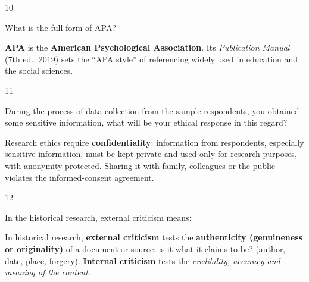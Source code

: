 \begin{question}{10}
{What is the full form of APA?\par}
\begin{explain}
\textbf{APA} is the \textbf{American Psychological Association}. Its \emph{Publication Manual} (7th ed., 2019) sets the ``APA style'' of referencing widely used in education and the social sciences.
\end{explain}
\end{question}

\begin{question}{11}
{During the process of data collection from the sample respondents, you obtained some sensitive information, what will be your ethical response in this regard?\par}
\begin{explain}
Research ethics require \textbf{confidentiality}: information from respondents, especially sensitive information, must be kept private and used only for research purposes, with anonymity protected. Sharing it with family, colleagues or the public violates the informed-consent agreement.
\end{explain}
\end{question}

\begin{question}{12}
{In the historical research, external criticism means:\par}
\begin{explain}
In historical research, \textbf{external criticism} tests the \textbf{authenticity (genuineness or originality)} of a document or source: is it what it claims to be? (author, date, place, forgery). \textbf{Internal criticism} tests the \emph{credibility, accuracy and meaning of the content}.
\end{explain}
\end{question}

